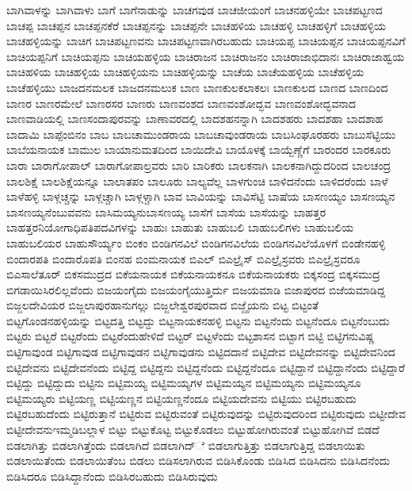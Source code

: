{ಬಾಗಿವಾಳನ್ನು
ಬಾಗಿವಾಳು
ಬಾಗೆ
ಬಾಗೆನಾಡುನ್ನು
ಬಾಚಗವುಡ
ಬಾಚಜೀಯಂಗೆ
ಬಾಚನಹಳ್ಳಿಯೇ
ಬಾಚಪಟ್ಟಣದ
ಬಾಚಪ್ಪ
ಬಾಚಪ್ಪನ
ಬಾಚಪ್ಪನಕೆರೆ
ಬಾಚಪ್ಪನನ್ನು
ಬಾಚಪ್ಪನೇ
ಬಾಚಹಳಿಯ
ಬಾಚಹಳ್ಳಿ
ಬಾಚಹಳ್ಳಿಗೆ
ಬಾಚಹಳ್ಳಿಯ
ಬಾಚಹಳ್ಳಿಯನ್ನು
ಬಾಚಿಗ
ಬಾಚಿಪಟ್ಟಣವನು
ಬಾಚಿಪಟ್ಟಣವಾಗಿರಬಹುದು
ಬಾಚಿಯಪ್ಪ
ಬಾಚಿಯಪ್ಪನ
ಬಾಚಿಯಪ್ಪನವಿಗೆ
ಬಾಚಿಯಪ್ಪನಿಗೆ
ಬಾಚಿಯಪ್ಪನು
ಬಾಚಿಯಹಳ್ಳಿಯ
ಬಾಚಿರಾಜನ
ಬಾಚಿರಾಜನಂ
ಬಾಚಿರಾಜಾಭಿದಾನಃ
ಬಾಚಿರಾಜಾಹ್ವಯ
ಬಾಚಿಹಳಿಯ
ಬಾಚಿಹಳ್ಳಿಯ
ಬಾಚಿಹಳ್ಳಿಯನು
ಬಾಚಿಹಳ್ಳಿಯನ್ನು
ಬಾಚೆಯ
ಬಾಚೆಯಹಳ್ಳಿಯ
ಬಾಚೆಹಳ್ಳಿಯ
ಬಾಚೆಹಳ್ಳಿಯು
ಬಾಜದನಮಲಕ
ಬಾಜದನಮಲುಕ
ಬಾಣ
ಬಾಣಕುಲಕಲಾಕಲಃ
ಬಾಣಕುಲದ
ಬಾಣದ
ಬಾಣದಿಂದ
ಬಾಣರ
ಬಾಣರಮೇಲೆ
ಬಾಣರಸರ
ಬಾಣರು
ಬಾಣವಂಶದ
ಬಾಣವಂಶೋದ್ಭವ
ಬಾಣವಂಶೋದ್ಭವನಾದ
ಬಾಣವಾಡಿಯಲ್ಲಿ
ಬಾಣಸಂದಾಪುರವನ್ನು
ಬಾಣಾವರದಲ್ಲಿ
ಬಾದಶಹನನ್ನಾಗಿ
ಬಾದಶಹರು
ಬಾದಶಹಾ
ಬಾದಶಾಹ
ಬಾದಾಮಿ
ಬಾಪ್ಪೆಂಬಿನಂ
ಬಾಬ
ಬಾಬಚಾಮುಂಡರಾಯ
ಬಾಬಚಾವುಂಡರಾಯ
ಬಾಬಸಿಂಘೂರಹರು
ಬಾಬುಸೆಟ್ಟಿಯು
ಬಾಬೆಯನಾಯಕ
ಬಾಮುಲ
ಬಾಯಾನುಮತದಿಂದ
ಬಾಯಿದೇವಿ
ಬಾಯೊಳಕ್ಕೆ
ಬಾಯ್ಬೆಣ್ಣೆಗೆ
ಬಾರಂದರ
ಬಾರಕೂರು
ಬಾರಾ
ಬಾರಾಗೋಪಾಲ್
ಬಾರಾಗೋಪಾಲ್ರವರು
ಬಾರಿ
ಬಾರಿಕರು
ಬಾಲಕನಾಗಿ
ಬಾಲಕನಾಗಿದ್ದುದರಿಂದ
ಬಾಲಚಂದ್ರ
ಬಾಲಶಿಕ್ಷೆ
ಬಾಲಶಿಕ್ಷೆಯನ್ನೂ
ಬಾಲಾತಪಂ
ಬಾಲೂರು
ಬಾಲ್ಯವೆಲ್ಲ
ಬಾಳಗುಂಚಿ
ಬಾಳಿದನೆಂದು
ಬಾಳಿದರೆಂದು
ಬಾಳೆ
ಬಾಳೆಹಳ್ಳಿ
ಬಾಳ್ಗಚ್ಚನ್ನು
ಬಾಳ್ಗಚ್ಚಾಗಿ
ಬಾಳ್ಗಳ್ಚಾಗಿ
ಬಾವ
ಬಾವಿಯನ್ನು
ಬಾವಿಸೆಟ್ಟಿ
ಬಾಷೆಯ
ಬಾಸಣಯ್ಯಂ
ಬಾಸಣಯ್ಯನ
ಬಾಸಣಯ್ಯನೆಂಬುವವನು
ಬಾಸಿಮಯ್ಯನುಬಾಸಣಯ್ಯ
ಬಾಸೆಗೆ
ಬಾಸೆಯ
ಬಾಸೆಯನ್ನು
ಬಾಹತ್ತರ
ಬಾಹತ್ತರನಿಯೋಗಾಧಿಪತಿಪದವಿಗಳನ್ನು
ಬಾಹುಃ
ಬಾಹುತು
ಬಾಹುಬಲಿ
ಬಾಹುಬಲಿಗಳು
ಬಾಹುಬಲಿಯ
ಬಾಹುಬಲಿಯರ
ಬಾಹುಸೌರ್ಯ್ಯಂ
ಬಿಂಕಂ
ಬಿಂಡಿಗನವಿಲೆ
ಬಿಂಡಿಗನವಿಲೆಯ
ಬಿಂಡಿಗನವಿಲೆಯೊಳಗೆ
ಬಿಂಡೇನಹಳ್ಳಿ
ಬಿಂದಾರಪತಿ
ಬಿಂದಾರೊಪತಿ
ಬಿಂನಹ
ಬಿಂಮನಾಯಕ
ಬಿಎಲ್
ಬಿಎಲ್ರೈಸ್
ಬಿಎಲ್ರೈಸ್ರವರು
ಬಿಎಲ್ರೈಸ್ರವರೂ
ಬಿಎಸಾಲೆತೂರ್
ಬಿಕಸಮುದ್ರದ
ಬಿಕೆಯನಾಯಕ
ಬಿಕೆಯನಾಯಕನೂ
ಬಿಕೆಯನಾಯಕರು
ಬಿಕ್ಕಸಂದ್ರ
ಬಿಕ್ಕಸಮುದ್ರ
ಬಿಗಡಾಯಿಸಿರಲಿಲ್ಲವೆಂದು
ಬಿಜಯಂಗೈದು
ಬಿಜಯಂಗೈಯುತ್ತಿರ್ದು
ಬಿಜಯಮಾಡಿ
ಬಿಜಾಪುರದ
ಬಿಜೆಯಮಾಡಿದ್ದ
ಬಿಜ್ಜಲದೇವಿಯರ
ಬಿಜ್ಜಲಾಪುರಹಾನುಗಲ್ಲು
ಬಿಜ್ಜಲೇಶ್ವರಪುರವಾದ
ಬಿಜ್ಜೈಯನು
ಬಿಟ್ಟ
ಬಿಟ್ಟಂತೆ
ಬಿಟ್ಟಗೊಂಡನಹಳ್ಳಿಯನ್ನು
ಬಿಟ್ಟದತ್ತಿ
ಬಿಟ್ಟದ್ದು
ಬಿಟ್ಟನಾಯಕನಹಳ್ಳಿ
ಬಿಟ್ಟನು
ಬಿಟ್ಟನೆಂದು
ಬಿಟ್ಟನೆಂದೂ
ಬಿಟ್ಟನೆಂಬುದು
ಬಿಟ್ಟರು
ಬಿಟ್ಟರೆ
ಬಿಟ್ಟರೆಂದು
ಬಿಟ್ಟರೆಂದುಹೇಳಿದೆ
ಬಿಟ್ಟರ್
ಬಿಟ್ಟಳೆಂದು
ಬಿಟ್ಟಶಾಸನ
ಬಿಟ್ಟಾಗ
ಬಿಟ್ಟಿ
ಬಿಟ್ಟಿಗನುವಿಷ್ಣ
ಬಿಟ್ಟಿಗಾವುಂಡ
ಬಿಟ್ಟಿಗಾವುಡ
ಬಿಟ್ಟಿಗಾವುಡನ
ಬಿಟ್ಟಿಗಾವುಡನು
ಬಿಟ್ಟಿದದಾನೆ
ಬಿಟ್ಟಿದೇವ
ಬಿಟ್ಟಿದೇವನನ್ನು
ಬಿಟ್ಟಿದೇವನಿಂದ
ಬಿಟ್ಟಿದೇವನು
ಬಿಟ್ಟಿದೇವನೆಂದು
ಬಿಟ್ಟಿದ್ದ
ಬಿಟ್ಟಿದ್ದನು
ಬಿಟ್ಟಿದ್ದನೆಂದು
ಬಿಟ್ಟಿದ್ದನೆಂದೂ
ಬಿಟ್ಟಿದ್ದಾನೆ
ಬಿಟ್ಟಿದ್ದಾನೆಂದು
ಬಿಟ್ಟಿದ್ದಾರೆ
ಬಿಟ್ಟಿದ್ದು
ಬಿಟ್ಟಿದ್ದುದು
ಬಿಟ್ಟಿನು
ಬಿಟ್ಟಿಮಯ್ಯ
ಬಿಟ್ಟಿಮಯ್ಯಗಳ
ಬಿಟ್ಟಿಮಯ್ಯನ
ಬಿಟ್ಟಿಮಯ್ಯನು
ಬಿಟ್ಟಿಮಯ್ಯನೂ
ಬಿಟ್ಟಿಮಯ್ಯರು
ಬಿಟ್ಟಿಯಣ್ಣ
ಬಿಟ್ಟಿಯಣ್ಣನ
ಬಿಟ್ಟಿಯಣ್ಣನೆಂದೂ
ಬಿಟ್ಟಿಯದೇವನು
ಬಿಟ್ಟಿಯು
ಬಿಟ್ಟಿರಬಹುದು
ಬಿಟ್ಟಿರಬಹುದೆಂದು
ಬಿಟ್ಟಿರುತ್ತಾನೆ
ಬಿಟ್ಟಿರುವ
ಬಿಟ್ಟಿರುವಂತೆ
ಬಿಟ್ಟಿರುವುದನ್ನು
ಬಿಟ್ಟಿರುವುದರಿಂದ
ಬಿಟ್ಟಿರುವುದು
ಬಿಟ್ಟೀದೇವ
ಬಿಟ್ಟೀದೇವನುಇಮ್ಮಡಿಬಲ್ಲಾಳ
ಬಿಟ್ಟು
ಬಿಟ್ಟುಕೊಟ್ಟ
ಬಿಟ್ಟುಕೊಡಲು
ಬಿಟ್ಟುಹೋಗಿರುವಂತೆ
ಬಿಟ್ಟುಹೋಗಿವೆ
ಬಿಡದೆ
ಬಿಡಲಾಗಿತ್ತು
ಬಿಡಲಾಗಿತ್ತೆಂದು
ಬಿಡಲಾಗಿದೆ
ಬಿಡಲಾಗಿದ್ೆ
ಬಿಡಲಾಗುತ್ತಿತ್ತು
ಬಿಡಲಾಗುತ್ತಿದ್ದ
ಬಿಡಲಾಯಿತು
ಬಿಡಲಾಯಿತೆಂದು
ಬಿಡಲಾಯಿತೆಂಬ
ಬಿಡಲು
ಬಿಡಿಸಲಾಗಿರುವ
ಬಿಡಿಸಿಕೊಂಡು
ಬಿಡಿಸಿದ
ಬಿಡಿಸಿದನು
ಬಿಡಿಸಿದನೆಂದು
ಬಿಡಿಸಿದರೂ
ಬಿಡಿಸಿದ್ದಾನೆಂದು
ಬಿಡಿಸಿರಬಹುದು
ಬಿಡಿಸಿರುವುದು
}
